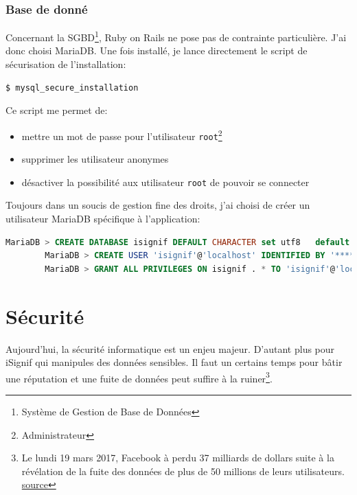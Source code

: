 \documentclass[]{report}
\begin{document}
    \subsection{Base de donné}

      Concernant la SGBD\footnote{Système de Gestion de Base de Données}, Ruby on Rails ne pose pas de contrainte particulière. J’ai donc choisi MariaDB. Une fois installé, je lance directement le script de sécurisation de l’installation:

      \begin{scriptsize}
      \begin{lstlisting}[language=bash]
      $ mysql_secure_installation
      \end{lstlisting}
      \end{scriptsize}

      Ce script me permet de:

      \begin{itemize}
      \item mettre un mot de passe pour l’utilisateur \verb|root|\footnote{Administrateur}
      \item supprimer les utilisateur anonymes
      \item désactiver la possibilité aux utilisateur \verb|root| de pouvoir se connecter
      \end{itemize}

      Toujours dans un soucis de gestion fine des droits, j’ai choisi de créer un utilisateur MariaDB spécifique à l’application:

      \begin{scriptsize}
        \begin{lstlisting}[language=sql]
        MariaDB > CREATE DATABASE isignif DEFAULT CHARACTER set utf8   default COLLATE utf8_general_ci;
        MariaDB > CREATE USER 'isignif'@'localhost' IDENTIFIED BY '****';
        MariaDB > GRANT ALL PRIVILEGES ON isignif . * TO 'isignif'@'localhost';
        \end{lstlisting}
      \end{scriptsize}

\chapter{Sécurité}

  Aujourd'hui, la sécurité informatique est un enjeu majeur. D'autant plus pour iSignif qui manipules des données sensibles. Il faut un certains temps pour bâtir une réputation et une fuite de données peut suffire à la ruiner\footnote{Le lundi 19 mars 2017, Facebook à perdu 37 milliards de dollars suite à la révélation de la fuite des données de plus de 50 millions de leurs utilisateurs.  \href{https://www.lci.fr/high-tech/affaire-cambridge-analytica-quel-est-ce-scandale-qui-plonge-facebook-dans-la-crise-mark-zuckerberg-2082228.html}{source}}.
\end{document}
